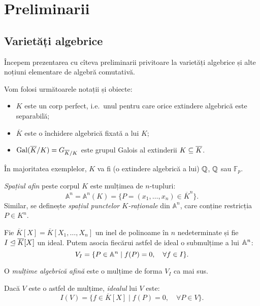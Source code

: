 
\chapter{Preliminarii}


\section{Varietăți algebrice}

Începem prezentarea cu cîteva preliminarii privitoare la varietăți algebrice
și alte noțiuni elementare de algebră comutativă.

Vom folosi următoarele notații și obiecte:
\begin{itemize}
\item $ K $ este un corp perfect, i.e.\ unul pentru care orice extindere algebrică
  este separabilă;
\item $ \overline{K} $ este o închidere algebrică fixată a lui $ K $;
\item $ \mathrm{Gal}(\overline{K}/K) = G_{\overline{K}/K} $ este grupul Galois
  al extinderii $ K \subseteq \overline{K} $.
\end{itemize}

În majoritatea exemplelor, $ K $ va fi (o extindere algebrică a lui) $ \mathbb{Q} $,
$ \mathbb{Q} $ sau $ \mathbb{F}_p $.

\begin{definition}\label{def:spatiu-afin}
  \emph{Spațiul afin} peste corpul $ K $ este mulțimea de $ n $-tupluri:
  \[
    \mathbb{A}^n = \mathbb{A}^n(K) = \{ P = (x_1, \dots, x_n) \in \overline{K}^n \}.
  \]
  Similar, se definește \emph{spațiul punctelor $ K $-raționale} din $ \mathbb{A}^n $,
  care conține restricția $ P \in K^n $.
\end{definition}

Fie $ \overline{K}[X] = \overline{K}[X_1, \dots, X_n] $ un inel de polinoame în $ n $
nedeterminate și fie $ I \trianglelefteq \overline{K}[X] $ un ideal. Putem asocia fiecărui
astfel de ideal o submulțime a lui $ \mathbb{A}^n $:
\[
  V_I = \{ P \in \mathbb{A}^n \mid f(P) = 0, \quad \forall f \in I \}.
\]

\begin{definition}\label{def:multime-algebrica-afina}
  O \emph{mulțime algebrică afină} este o mulțime de forma $ V_I $ ca mai sus.

  Dacă $ V $ este o astfel de mulțime, \emph{idealul} lui $ V $ este:
  \[
    I(V) = \{ f \in \overline{K}[X] \mid f(P) = 0, \quad \forall P \in V \}.
  \]
\end{definition}

